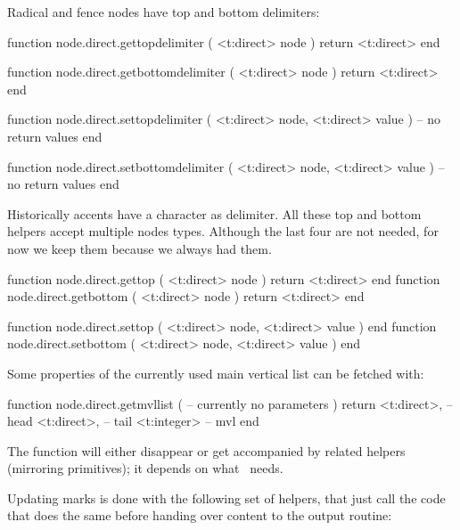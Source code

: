 Radical and fence nodes have top and bottom delimiters:

\starttyping[option=LUA]
function node.direct.gettopdelimiter ( <t:direct> node )
    return <t:direct>
end

function node.direct.getbottomdelimiter ( <t:direct> node )
    return <t:direct>
end

function node.direct.settopdelimiter (
    <t:direct> node,
    <t:direct> value
)
    -- no return values
end

function node.direct.setbottomdelimiter (
    <t:direct> node,
    <t:direct> value
)
    -- no return values
end
\stoptyping

Historically accents have a character as delimiter. All these top and bottom
helpers accept multiple nodes types. Although the last four are not needed, for
now we keep them because we always had them.

\starttyping[option=LUA]
function node.direct.gettop    ( <t:direct> node ) return <t:direct> end
function node.direct.getbottom ( <t:direct> node ) return <t:direct> end

function node.direct.settop    ( <t:direct> node, <t:direct> value ) end
function node.direct.setbottom ( <t:direct> node, <t:direct> value ) end
\stoptyping

%

\stopsubsection

\startsubsection[title={MVL}]

Some properties of the currently used main vertical list can be fetched with:

\starttyping[option=LUA]
function node.direct.getmvllist (
    -- currently no parameters
)
    return
        <t:direct>,  -- head
        <t:direct>,  -- tail
        <t:integer> -- mvl
end
\stoptyping

\stopsubsection

\startsubsection[title={Balancing}]

The  function will either disappear or get accompanied
by related helpers (mirroring primitives); it depends on what \CONTEXT\ needs.

Updating marks is done with the following set of helpers, that just call the code
that does the same before handing over content to the output routine:

